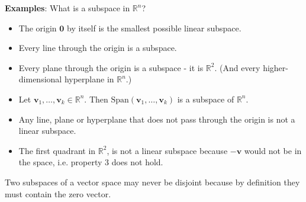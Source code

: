\textbf{Examples}: What is a subspace in $\mathbb{R}^n$?
\begin{itemize}
    \item The origin $\mathbf{0}$ by itself is the smallest possible linear subspace.
    \item Every line through the origin is a subspace.
    \item Every plane through the origin is a subspace - it is $\mathbb{R}^2$. (And every higher-dimensional hyperplane in $\mathbb{R}^n$.)
    \item Let $\mathbf{v}_1, \dots, \mathbf{v}_k \in \mathbb{R}^n$. Then $\text{Span}(\mathbf{v}_1, \dots, \mathbf{v}_k)$ is a subspace of $\mathbb{R}^n$.
    \item Any line, plane or hyperplane that does not pass through the origin is not a linear subspace.
    \item The first quadrant in $\mathbb{R}^2$, is not a linear subspace because $-\mathbf{v}$ would not be in the space, i.e. property 3 does not hold.
\end{itemize}

Two subspaces of a vector space may never be disjoint because by definition they must contain the zero vector.

